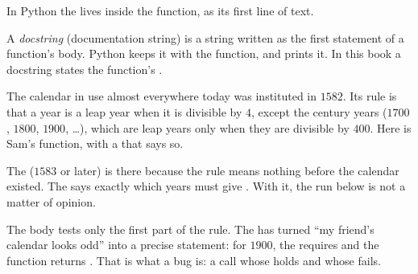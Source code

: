 In Python the  lives inside the function, as its first line of text.

\begin{definition}[Docstring]\label{def:g10:specifications-and-tests:docstring}
A \emph{docstring} (documentation string) is a string written as the first statement of a
function's body. Python keeps it with the function, and  prints it. In this book a docstring states
the function's .
\end{definition}

The calendar in use almost everywhere today was instituted in $1582$. Its rule is that a year is a leap year when
it is divisible by $4$, except the century years ($1700$, $1800$, $1900$, \dots), which are leap years only when
they are divisible by $400$. Here is Sam's function, with a  that says so.

\label{lst:g10:specifications-and-tests:leap}

The  ($1583$ or later) is there because the rule means nothing before the calendar existed. The
 says exactly which years must give . With it, the run below is not a matter of opinion.

\label{out:g10:specifications-and-tests:leap-demo}

The body tests only the first part of the rule. The  has turned ``my friend's calendar looks odd''
into a precise statement: for $1900$, the  requires  and the function returns
. That is what a bug is: a call whose  holds and whose  fails.

